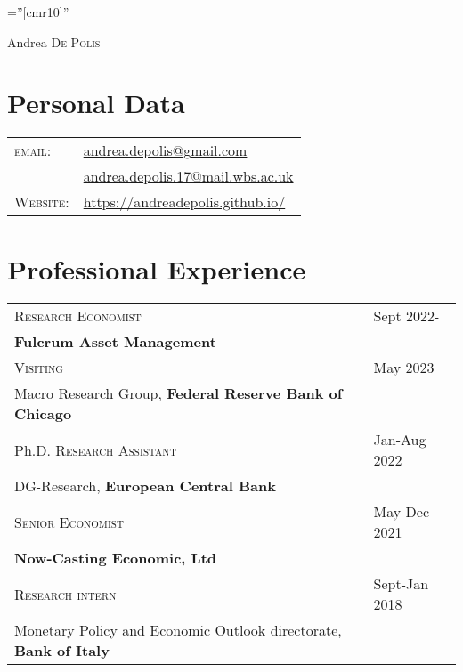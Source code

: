 \documentclass[a4paper,12pt]{article}
\begin{document}
\font\fb=''[cmr10]''

\par{\centering
		{\Huge Andrea \textsc{De Polis}
	}\par}

\section{Personal Data}
\renewcommand{\arraystretch}{0.75}
\begin{tabular}{ll}
        \textsc{email:}     & \href{mailto:andrea.depolis@gmail.com}{andrea.depolis@gmail.com}\\
                        & \href{mailto:andrea.depolis.17@mail.wbs.ac.uk}{andrea.depolis.17@mail.wbs.ac.uk} \\
    \textsc{Website:}   & \url{https://andreadepolis.github.io/}            
                        
\end{tabular}

\section{Professional Experience}
\begin{tabular*}{\linewidth}{@{}l@{\hspace{.15\linewidth}}l}
\textsc{Research Economist} & Sept 2022-\\
\textbf{Fulcrum Asset Management}\\[1em]
\textsc{Visiting} & May 2023 \\
Macro Research Group, \textbf{Federal Reserve Bank of Chicago}\\[1em]
Ph.D. \textsc{Research Assistant} & Jan-Aug 2022\\
DG-Research, \textbf{European Central Bank}\\[1em]
\textsc{Senior Economist} & May-Dec 2021\\
\textbf{Now-Casting Economic, Ltd}\\[1em]
\textsc{Research intern} & Sept-Jan 2018\\
Monetary Policy and Economic Outlook directorate, \textbf{Bank of Italy}
\end{tabular*}
\end{document}
